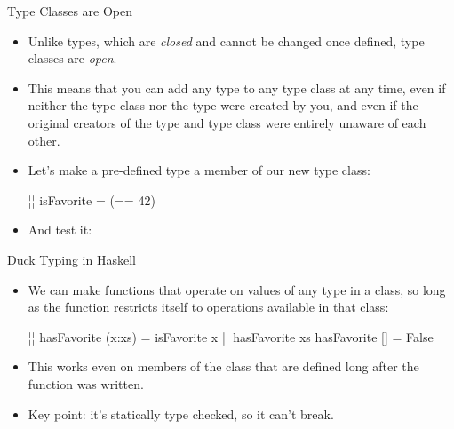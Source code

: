\documentclass[xcolor=dvipsnames]{beamer}          %
\newcommand{\lH}[1]{\color{MidnightBlue}{#1}}
\newcommand{\lT}[1]{\color{Fuchsia}{#1}}        %
\newcommand{\lS}[1]{\color{Green}{#1}}
\begin{document}
\begin{frame}[fragile]{Type Classes are Open}
\begin{itemize}
    \item Unlike types, which are \emph{closed} and cannot be changed
        once defined, type classes are \emph{open}.
    \item This means that you can add any type to any type class at any
        time, even if neither the type class nor the type were created
        by you, and even if the original creators of the type and type
        class were entirely unaware of each other.
    \item Let's make a pre-defined type a member of our new type class:
        \begin{hlisting}
            ¦\lT{instance Favorite Int where}¦
                isFavorite = (== 42)
        \end{hlisting}
    \item And test it:
\end{itemize}
\end{frame}


\begin{frame}[fragile]{Duck Typing in Haskell}
\begin{itemize}
    \item We can make functions that operate on values of any type in
        a class, so long as the function restricts itself to operations
        available in that class:
        \begin{hlisting}
            ¦\lT{hasFavorite :: Favorite a => [a] -> Bool}¦
            hasFavorite (x:xs) = isFavorite x || hasFavorite xs
            hasFavorite []     = False
        \end{hlisting}
    \item This works even on members of the class that are defined long
        after the function was written.
    \item Key point: it's statically type checked, so it can't break.
\end{itemize}
\end{frame}
\end{document}
